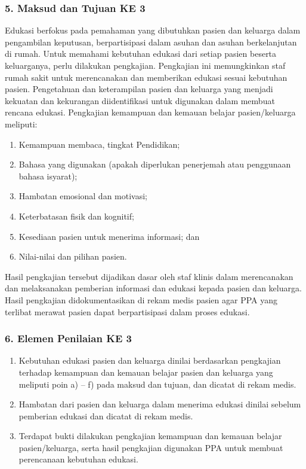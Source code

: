 \documentclass[
]{book}
\providecommand{\tightlist}{%
  \setlength{\itemsep}{0pt}\setlength{\parskip}{0pt}}
\begin{document}
\hypertarget{maksud-dan-tujuan-ke-3}{%
\subsubsection*{5. Maksud dan Tujuan KE 3}\label{maksud-dan-tujuan-ke-3}}

Edukasi berfokus pada pemahaman yang dibutuhkan pasien dan keluarga dalam pengambilan keputusan, berpartisipasi dalam asuhan dan asuhan berkelanjutan di rumah. Untuk memahami kebutuhan edukasi dari setiap pasien beserta keluarganya, perlu dilakukan pengkajian. Pengkajian ini memungkinkan staf rumah sakit untuk merencanakan dan memberikan edukasi sesuai kebutuhan pasien. Pengetahuan dan keterampilan pasien dan keluarga yang menjadi kekuatan dan kekurangan diidentifikasi untuk digunakan dalam membuat rencana edukasi.
Pengkajian kemampuan dan kemauan belajar pasien/keluarga meliputi:

\begin{enumerate}
\def\labelenumi{\alph{enumi}.}
\tightlist
\item
  Kemampuan membaca, tingkat Pendidikan;
\item
  Bahasa yang digunakan (apakah diperlukan penerjemah atau penggunaan bahasa isyarat);
\item
  Hambatan emosional dan motivasi;
\item
  Keterbatasan fisik dan kognitif;
\item
  Kesediaan pasien untuk menerima informasi; dan
\item
  Nilai-nilai dan pilihan pasien.
\end{enumerate}

Hasil pengkajian tersebut dijadikan dasar oleh staf klinis dalam merencanakan dan melaksanakan pemberian informasi dan edukasi kepada pasien dan keluarga. Hasil pengkajian didokumentasikan di rekam medis pasien agar PPA yang terlibat merawat pasien dapat berpartisipasi dalam proses edukasi.

\hypertarget{elemen-penilaian-ke-3}{%
\subsubsection*{6. Elemen Penilaian KE 3}\label{elemen-penilaian-ke-3}}

\begin{enumerate}
\def\labelenumi{\alph{enumi}.}
\tightlist
\item
  Kebutuhan edukasi pasien dan keluarga dinilai berdasarkan pengkajian terhadap kemampuan dan kemauan belajar pasien dan keluarga yang meliputi poin a) -- f) pada maksud dan tujuan, dan dicatat di rekam medis.
\item
  Hambatan dari pasien dan keluarga dalam menerima edukasi dinilai sebelum pemberian edukasi dan dicatat di rekam medis.
\item
  Terdapat bukti dilakukan pengkajian kemampuan dan kemauan belajar pasien/keluarga, serta hasil pengkajian digunakan PPA untuk membuat perencanaan kebutuhan edukasi.
\end{enumerate}
\end{document}
